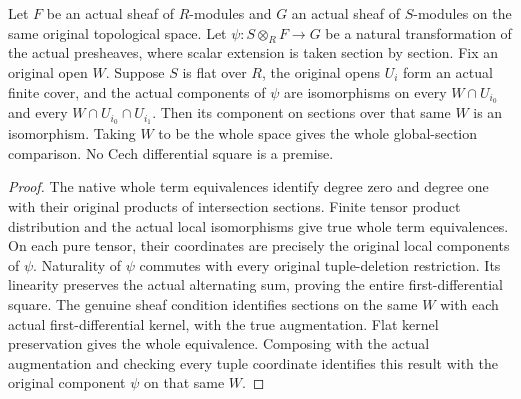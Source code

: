 \begin{proposition}
\label{prop:fc-finite-cech-flat-base-change}
\leanok
{}
Let $F$ be an actual sheaf of $R$-modules and $G$ an actual sheaf of
$S$-modules on the same original topological space. Let
$\psi:S\otimes_R F\to G$ be a natural transformation of the actual
presheaves, where scalar extension is taken section by section. Fix an
original open $W$. Suppose $S$ is flat over $R$, the original opens
$U_i$ form an actual finite cover, and the actual components of $\psi$
are isomorphisms on every $W\cap U_{i_0}$ and every
$W\cap U_{i_0}\cap U_{i_1}$. Then its component on sections over that
same $W$ is an isomorphism. Taking $W$ to be the whole space gives the
whole global-section comparison. No Cech differential square is a premise.
\end{proposition}
\begin{proof}
The native whole term equivalences identify degree zero and degree one
with their original products of intersection sections. Finite tensor
product distribution and the actual local isomorphisms give true whole
term equivalences. On each pure tensor, their coordinates are precisely
the original local components of $\psi$. Naturality of $\psi$ commutes
with every original tuple-deletion restriction. Its linearity preserves
the actual alternating sum, proving the entire first-differential square.
The genuine sheaf condition identifies sections on the same $W$ with each actual
first-differential kernel, with the true augmentation. Flat kernel
preservation gives the whole equivalence. Composing with the actual
augmentation and checking every tuple coordinate identifies this
result with the original component $\psi$ on that same $W$.
\end{proof}
